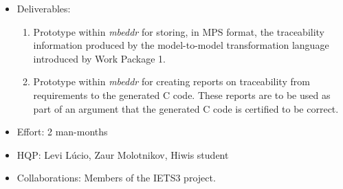 \begin{itemize}
  \item Deliverables:
  \begin{enumerate}
    \item Prototype within \emph{mbeddr} for storing, in MPS format, the
    traceability information produced by the model-to-model transformation
    language introduced by Work Package 1.
    \item Prototype within \emph{mbeddr} for creating reports on traceability
    from requirements to the generated C code. These reports are to be used as
    part of an argument that the generated C code is certified to be correct.
  \end{enumerate}
  \item Effort: 2 man-months
  \item HQP: Levi L\'ucio, Zaur Molotnikov, Hiwis student
  \item Collaborations: Members of the IETS3 project.
\end{itemize}
